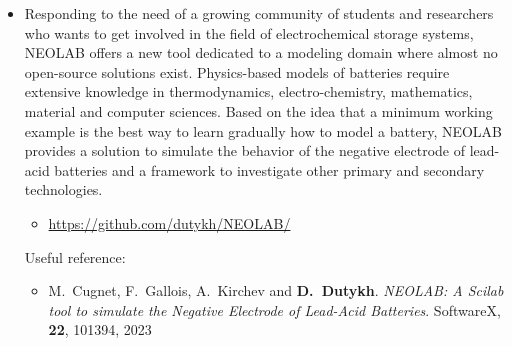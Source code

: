 \documentclass[final, a4paper, oneside, 12pt]{article}
\numberwithin{equation}{section}
\begin{document}
\begin{itemize}

  \item Responding to the need of a growing community of students and researchers who wants to get involved in the field of electrochemical storage systems, NEOLAB offers a new tool dedicated to a modeling domain where almost no open-source solutions exist. Physics-based models of batteries require extensive knowledge in thermodynamics, electro-chemistry, mathematics, material and computer sciences. Based on the idea that a minimum working example is the best way to learn gradually how to model a battery, NEOLAB provides a solution to simulate the behavior of the negative electrode of lead-acid batteries and a framework to investigate other primary and secondary technologies.

  \begin{itemize}

    \item \url{https://github.com/dutykh/NEOLAB/}

  \end{itemize}

  Useful reference:
  \begin{itemize}

    \item M.~Cugnet, F.~Gallois, A.~Kirchev and \textbf{D.~Dutykh}. \textit{NEOLAB: A Scilab tool to simulate the Negative Electrode of Lead-Acid Batteries}. SoftwareX, \textbf{22}, 101394, 2023

  \end{itemize}

\end{itemize}
\end{document}
